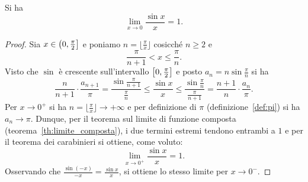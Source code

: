 \begin{theorem}
  \label{th:limite_notevole_sin}%
Si ha
\begin{equation}\label{eq:limite_notevole_sin}
 \lim_{x\to 0} \frac{\sin x}{x} = 1.
\end{equation}
\end{theorem}
%
\begin{proof}
Sia $x\in \left(0,\frac \pi 2\right]$ e poniamo 
$n = \lfloor \frac \pi x \rfloor$ 
cosicché $n\ge 2$ e
\[ 
  \frac{\pi}{n+1} < x \le \frac{\pi}{n}.
\]
Visto che $\sin$ è crescente sull'intervallo $\left[0,\frac \pi 2\right]$
e posto $a_n = n \sin \frac{\pi}{n}$ si ha
\[
  \frac{n}{n+1} \cdot \frac{a_{n+1}}{\pi}
  = \frac{\sin \frac{\pi}{n+1}}{\frac{\pi}{n}} 
  \le \frac{\sin x}{x} 
  \le \frac{\sin \frac{\pi}{n}}{\frac{\pi}{n+1}}
  = \frac{n+1}{n} \cdot \frac{a_n}{\pi}.
\]
Per $x\to 0^+$ si ha $n = \lfloor \frac \pi x \rfloor \to +\infty$
e per definizione di $\pi$ (definizione~\ref{def:pi}) si ha $a_n \to \pi$.
Dunque, per il teorema sul limite di funzione composta 
(teorema~\ref{th:limite_composta}), 
i due termini estremi tendono entrambi a $1$
e per il teorema dei carabinieri si ottiene,
come voluto:
\[
   \lim_{x\to 0^+} \frac{\sin x}{x} = 1.
\]
Osservando che $\frac{\sin(-x)}{-x} = \frac{\sin x}{x}$, 
si ottiene lo stesso limite per $x\to 0^-$.
\end{proof}

